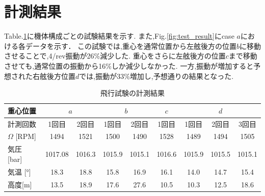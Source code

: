     \clearpage
    \section{計測結果}
    \label{sec:flight_test_result}
    \par
    Table.\ref{table:flight_test_result}に機体構成ごとの試験結果を示す.
    また,Fig.\ref{fig:test_result}にcase $a$における各データを示す．
    この試験では,重心を通常位置から左舷後方の位置$b$に移動させることで,4/rev振動が26\%減少した.
    重心をさらに左舷後方の位置$c$まで移動させても,通常位置の振動から16\%しか減少しなかった.
    一方,振動が増加すると予想された右舷後方位置$d$では,振動が33\%増加し,予想通りの結果となった.


    \begin{table}[H]
        \centering
        \caption{飛行試験の計測結果}
        \label{table:flight_test_result}
        \setlength{\tabcolsep}{5pt}
        \begin{tabular}{|l|l|l|l|l|l|l|l|l|}
            \hline 重心位置                         & \multicolumn{2}{|c|}{$a$} &  \multicolumn{2}{|c|}{$b$} & \multicolumn{1}{c|}{$c$} &  \multicolumn{3}{|c|}{$d$} \\
            \hline 計測回数                         & \multicolumn{1}{c|}{1回目} & \multicolumn{1}{c|}{2回目} & \multicolumn{1}{c|}{1回目} &  \multicolumn{1}{c|}{2回目}  &  \multicolumn{1}{c|}{1回目}  & \multicolumn{1}{c|}{1回目} & \multicolumn{1}{c|}{2回目}  &  \multicolumn{1}{c|}{3回目}   \\
            \hline $\Omega$ [RPM]                  & \multicolumn{1}{c|}{1494}  & \multicolumn{1}{c|}{1521}  & \multicolumn{1}{c|}{1500}  & \multicolumn{1}{c|}{1490}   &  \multicolumn{1}{c|}{1528}   & \multicolumn{1}{c|}{1489}  & \multicolumn{1}{c|}{1494}  & \multicolumn{1}{c|}{1505}  \\
            \hline 気圧 [bar]                      & \multicolumn{1}{c|}{1017.08} & \multicolumn{1}{c|}{1016.3} & \multicolumn{1}{c|}{1015.9} & \multicolumn{1}{c|}{1015.1}  & \multicolumn{1}{c|}{1016.6} & \multicolumn{1}{c|}{1015.9} & \multicolumn{1}{c|}{1015.5} & \multicolumn{1}{c|}{1015.1} \\
            \hline 気温 [°]                        & \multicolumn{1}{c|}{18.3}    & \multicolumn{1}{c|}{18.8}   & \multicolumn{1}{c|}{15.8}   & \multicolumn{1}{c|}{16.9}    & \multicolumn{1}{c|}{16.1}   & \multicolumn{1}{c|}{14.0}   & \multicolumn{1}{c|}{14.7}   & \multicolumn{1}{c|}{15.4}   \\
            \hline 高度[m]                         & \multicolumn{1}{c|}{13.5}    & \multicolumn{1}{c|}{18.9}   & \multicolumn{1}{c|}{17.6}   & \multicolumn{1}{c|}{27.6}    & \multicolumn{1}{c|}{10.5}   & \multicolumn{1}{c|}{10.3}   & \multicolumn{1}{c|}{12.5}   & \multicolumn{1}{c|}{18.6}   \\

\end{tabular}
\end{table}
